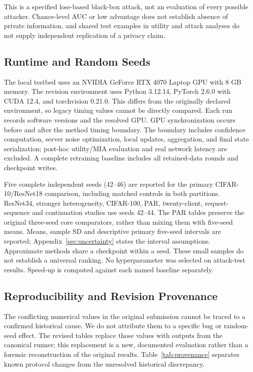 \documentclass[software,article,submit,moreauthors]{Definitions/mdpi}
\begin{document}
This is a specified loss-based black-box attack, not an evaluation of every
possible attacker. Chance-level AUC or low advantage does not establish absence
of private information, and shared test examples in utility and attack analyses
do not supply independent replication of a privacy claim.

\subsection{Runtime and Random Seeds}
\label{sec:runtime}
The local testbed uses an NVIDIA GeForce RTX 4070 Laptop GPU with 8 GB memory.
The revision environment uses Python 3.12.14, PyTorch 2.6.0 with CUDA 12.4, and
torchvision 0.21.0. This differs from the originally declared environment, so
legacy timing values cannot be directly compared. Each run records software
versions and the resolved GPU. GPU synchronization occurs before and after the
method timing boundary. The boundary includes confidence computation, server
noise optimization, local updates, aggregation, and final state serialization;
post-hoc utility/MIA evaluation and real network latency are excluded. A complete
retraining baseline includes all retained-data rounds and checkpoint writes.

Five complete independent seeds (42--46) are reported for the primary
CIFAR-10/ResNet18 comparison, including matched controls in both partitions.
ResNet34, stronger heterogeneity, CIFAR-100, PAR, twenty-client, request-sequence
and continuation studies use seeds 42--44. The PAR tables preserve the original
three-seed core comparators, rather than mixing them with five-seed means.
Means, sample SD and descriptive primary five-seed intervals are reported;
Appendix~\ref{sec:uncertainty} states the interval assumptions. Approximate
methods share a checkpoint within a seed. These small samples do not establish
a universal ranking. No hyperparameter was selected on attack-test results.
Speed-up is computed against each named baseline separately.

\subsection{Reproducibility and Revision Provenance}
\label{sec:reproducibility}
The conflicting numerical values in the original submission cannot be traced
to a confirmed historical cause. We do not attribute them to a specific bug or
random-seed effect. The revised tables replace those values with outputs from
the canonical runner; this replacement is a new, documented evaluation rather
than a forensic reconstruction of the original results. Table~\ref{tab:provenance}
separates known protocol changes from the unresolved historical discrepancy.
\end{document}
